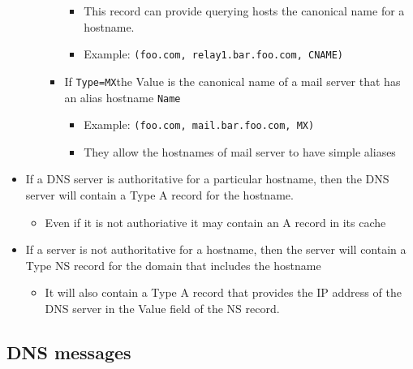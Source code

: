 \documentclass[11pt]{article}
\providecommand{\tightlist}{%
      \setlength{\itemsep}{0pt}\setlength{\parskip}{0pt}}
\begin{document}
\begin{itemize}
\begin{itemize}
\begin{itemize}
      \begin{itemize}
      \tightlist
      \item
        This record can provide querying hosts the canonical name for a
        hostname.
      \item
        Example: \texttt{(foo.com,\ relay1.bar.foo.com,\ CNAME)}
      \end{itemize}
    \item
      If \texttt{Type=MX}the Value is the canonical name of a mail
      server that has an alias hostname \texttt{Name}

      \begin{itemize}
      \tightlist
      \item
        Example: \texttt{(foo.com,\ mail.bar.foo.com,\ MX)}
      \item
        They allow the hostnames of mail server to have simple aliases
      \end{itemize}
    \end{itemize}
  \end{itemize}
\item
  If a DNS server is authoritative for a particular hostname, then the
  DNS server will contain a Type A record for the hostname.

  \begin{itemize}
  \tightlist
  \item
    Even if it is not authoriative it may contain an A record in its
    cache
  \end{itemize}
\item
  If a server is not authoritative for a hostname, then the server will
  contain a Type NS record for the domain that includes the hostname

  \begin{itemize}
  \tightlist
  \item
    It will also contain a Type A record that provides the IP address of
    the DNS server in the Value field of the NS record.
  \end{itemize}
\end{itemize}

    \subsection{DNS messages}\label{dns-messages}
\end{document}
